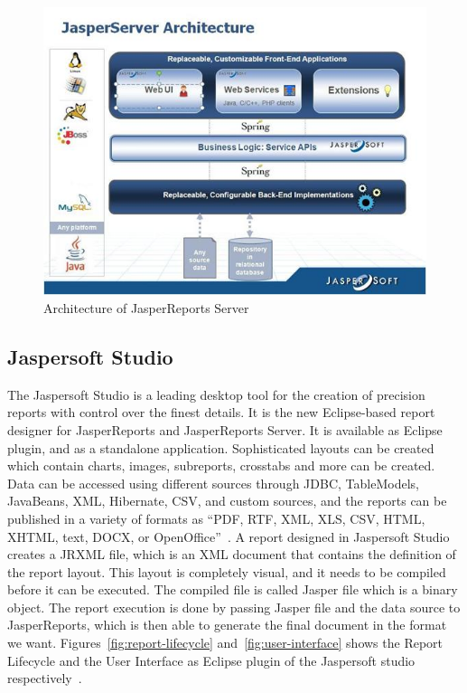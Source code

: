 \begin{figure}[!ht]
	\centering\includegraphics[width=\columnwidth]{../images/jasperreports-server.jpg}
	\caption{Architecture of JasperReports Server~\cite{hid-sp18-516-www-jasperreports-server-architecture}}
 	\label{fig:jasperreports-server}
\end{figure}

\subsection{Jaspersoft Studio}
The Jaspersoft Studio is a leading desktop tool for the creation of precision
reports with control over the finest details. It is the new Eclipse-based report
designer for JasperReports and JasperReports Server. It is available as
Eclipse~\cite{hid-sp18-516-www-eclipse} plugin, and as a standalone application.
Sophisticated layouts can be created which contain charts, images, subreports,
crosstabs and more can be created. Data can be accessed using different sources
through JDBC, TableModels, JavaBeans, XML, Hibernate, CSV, and custom sources,
and the reports can be published in a variety of formats as ``PDF, RTF, XML,
XLS, CSV, HTML, XHTML, text, DOCX, or
OpenOffice''~\cite{hid-sp18-516-www-jaspersoft-studio}. A report designed in
Jaspersoft Studio creates a JRXML file, which is an XML document that contains
the definition of the report layout. This layout is completely visual, and it
needs to be compiled before it can be executed. The compiled file is called
Jasper file which is a binary object. The report execution is done by passing
Jasper file and the data source to JasperReports, which is then able to generate
the final document in the format we want. Figures~\ref{fig:report-lifecycle}
and~\ref{fig:user-interface} shows the Report Lifecycle and the User Interface
as Eclipse plugin of the Jaspersoft studio
respectively~\cite{hid-sp18-516-www-jaspersoft-studio}.  

